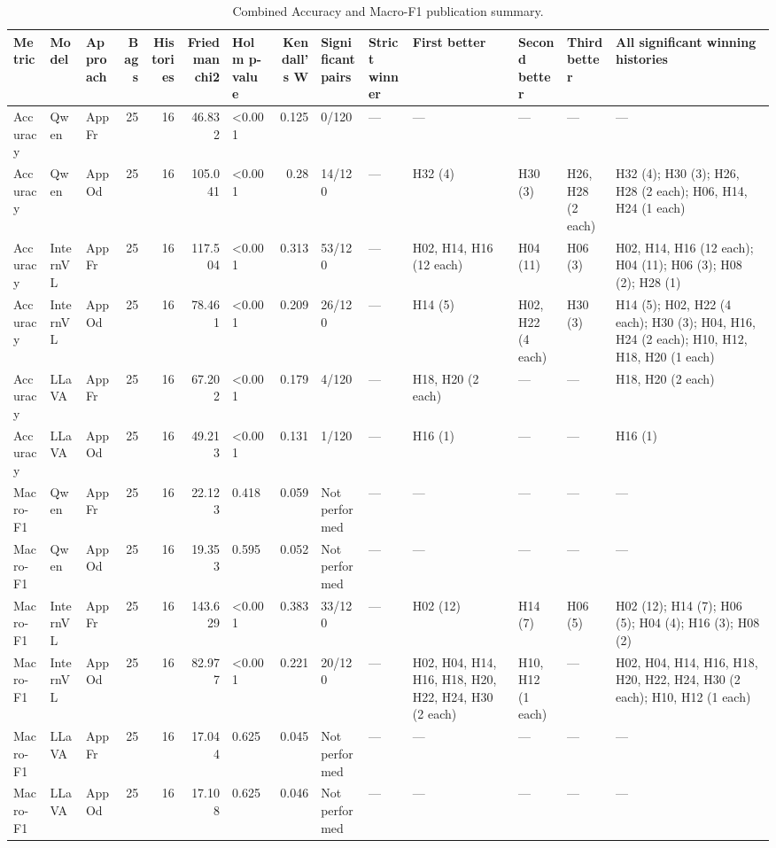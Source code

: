 \begin{table}[tbp]
\caption{Combined Accuracy and Macro-F1 publication summary.}
\label{tab:rq3-combined-summary}
\begin{tabular}{lllrrrlrllllll}
\toprule
Metric & Model & Approach & Bags & Histories & Friedman chi2 & Holm p-value & Kendall's W & Significant pairs & Strict winner & First better & Second better & Third better & All significant winning histories \\
\midrule
Accuracy & Qwen & AppFr & 25 & 16 & 46.832 & <0.001 & 0.125 & 0/120 & — & — & — & — & — \\
Accuracy & Qwen & AppOd & 25 & 16 & 105.041 & <0.001 & 0.28 & 14/120 & — & H32 (4) & H30 (3) & H26, H28 (2 each) & H32 (4); H30 (3); H26, H28 (2 each); H06, H14, H24 (1 each) \\
Accuracy & InternVL & AppFr & 25 & 16 & 117.504 & <0.001 & 0.313 & 53/120 & — & H02, H14, H16 (12 each) & H04 (11) & H06 (3) & H02, H14, H16 (12 each); H04 (11); H06 (3); H08 (2); H28 (1) \\
Accuracy & InternVL & AppOd & 25 & 16 & 78.461 & <0.001 & 0.209 & 26/120 & — & H14 (5) & H02, H22 (4 each) & H30 (3) & H14 (5); H02, H22 (4 each); H30 (3); H04, H16, H24 (2 each); H10, H12, H18, H20 (1 each) \\
Accuracy & LLaVA & AppFr & 25 & 16 & 67.202 & <0.001 & 0.179 & 4/120 & — & H18, H20 (2 each) & — & — & H18, H20 (2 each) \\
Accuracy & LLaVA & AppOd & 25 & 16 & 49.213 & <0.001 & 0.131 & 1/120 & — & H16 (1) & — & — & H16 (1) \\
Macro-F1 & Qwen & AppFr & 25 & 16 & 22.123 & 0.418 & 0.059 & Not performed & — & — & — & — & — \\
Macro-F1 & Qwen & AppOd & 25 & 16 & 19.353 & 0.595 & 0.052 & Not performed & — & — & — & — & — \\
Macro-F1 & InternVL & AppFr & 25 & 16 & 143.629 & <0.001 & 0.383 & 33/120 & — & H02 (12) & H14 (7) & H06 (5) & H02 (12); H14 (7); H06 (5); H04 (4); H16 (3); H08 (2) \\
Macro-F1 & InternVL & AppOd & 25 & 16 & 82.977 & <0.001 & 0.221 & 20/120 & — & H02, H04, H14, H16, H18, H20, H22, H24, H30 (2 each) & H10, H12 (1 each) & — & H02, H04, H14, H16, H18, H20, H22, H24, H30 (2 each); H10, H12 (1 each) \\
Macro-F1 & LLaVA & AppFr & 25 & 16 & 17.044 & 0.625 & 0.045 & Not performed & — & — & — & — & — \\
Macro-F1 & LLaVA & AppOd & 25 & 16 & 17.108 & 0.625 & 0.046 & Not performed & — & — & — & — & — \\
\bottomrule
\end{tabular}
\end{table}
